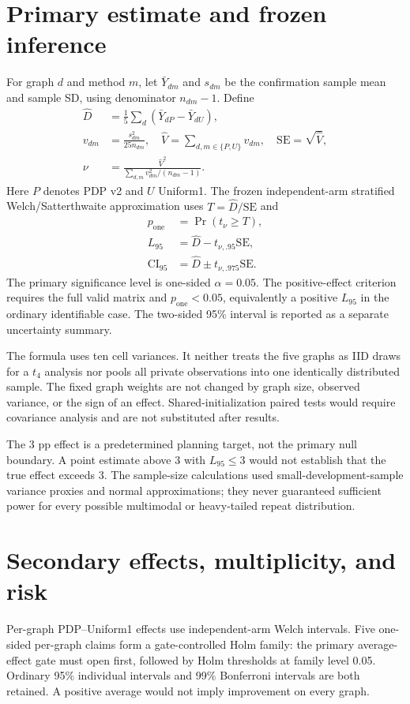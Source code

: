 \section{Primary estimate and frozen inference}
For graph $d$ and method $m$, let $\bar Y_{dm}$ and $s_{dm}$ be the confirmation sample mean and sample SD, using denominator $n_{dm}-1$. Define
\begin{align}
 \widehat D&=\frac15\sum_d(\bar Y_{dP}-\bar Y_{dU}),\\
 v_{dm}&=\frac{s_{dm}^2}{25n_{dm}},\quad
 \widehat V=\sum_{d,m\in\{P,U\}}v_{dm},\quad
 \mathrm{SE}=\sqrt{\widehat V},\\
 \nu&=\frac{\widehat V^2}{\sum_{d,m}v_{dm}^2/(n_{dm}-1)}.\label{eq:welch}
\end{align}
Here $P$ denotes PDP v2 and $U$ Uniform1. The frozen independent-arm stratified Welch/Satterthwaite approximation uses $T=\widehat D/\mathrm{SE}$ and
\begin{align}
 p_{\mathrm{one}}&=\Pr(t_\nu\geq T),\\
 L_{95}&=\widehat D-t_{\nu,.95}\mathrm{SE},\\
 \mathrm{CI}_{95}&=\widehat D\pm t_{\nu,.975}\mathrm{SE}.
\end{align}
The primary significance level is one-sided $\alpha=0.05$. The positive-effect criterion requires the full valid matrix and $p_{\mathrm{one}}<0.05$, equivalently a positive $L_{95}$ in the ordinary identifiable case. The two-sided 95\% interval is reported as a separate uncertainty summary.

The formula uses ten cell variances. It neither treats the five graphs as IID draws for a $t_4$ analysis nor pools all private observations into one identically distributed sample. The fixed graph weights are not changed by graph size, observed variance, or the sign of an effect. Shared-initialization paired tests would require covariance analysis and are not substituted after results.

The 3 pp effect is a predetermined planning target, not the primary null boundary. A point estimate above 3 with $L_{95}\leq3$ would not establish that the true effect exceeds 3. The sample-size calculations used small-development-sample variance proxies and normal approximations; they never guaranteed sufficient power for every possible multimodal or heavy-tailed repeat distribution.

\section{Secondary effects, multiplicity, and risk}
Per-graph PDP--Uniform1 effects use independent-arm Welch intervals. Five one-sided per-graph claims form a gate-controlled Holm family: the primary average-effect gate must open first, followed by Holm thresholds at family level 0.05. Ordinary 95\% individual intervals and 99\% Bonferroni intervals are both retained. A positive average would not imply improvement on every graph.

